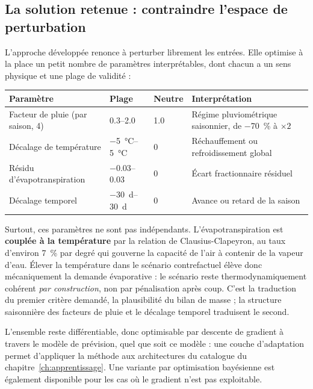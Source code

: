 \subsection{La solution retenue : contraindre l'espace de perturbation}

L'approche développée renonce à perturber librement les entrées. Elle optimise à la place un
petit nombre de paramètres interprétables, dont chacun a un sens physique et une plage de
validité :

\begin{center}
\begin{tabularx}{\textwidth}{@{}lllX@{}}
\toprule
\textbf{Paramètre} & \textbf{Plage} & \textbf{Neutre} & \textbf{Interprétation} \\
\midrule
Facteur de pluie (par saison, 4) & \numrange{0,3}{2,0} & \num{1,0} & Régime pluviométrique
saisonnier, de \SI{-70}{\percent} à $\times 2$ \\
Décalage de température & \SIrange{-5}{5}{\celsius} & \num{0} & Réchauffement ou refroidissement
global \\
Résidu d'évapotranspiration & \numrange{-0,03}{0,03} & \num{0} & Écart fractionnaire résiduel \\
Décalage temporel & \SIrange{-30}{30}{\day} & \num{0} & Avance ou retard de la saison \\
\bottomrule
\end{tabularx}
\end{center}

Surtout, ces paramètres ne sont pas indépendants. L'évapotranspiration est \textbf{couplée à la
température} par la relation de Clausius-Clapeyron, au taux d'environ \SI{7}{\percent} par degré
qui gouverne la capacité de l'air à contenir de la vapeur d'eau. Élever la température dans le
scénario contrefactuel élève donc mécaniquement la demande évaporative : le scénario reste
thermodynamiquement cohérent \emph{par construction}, non par pénalisation après coup. C'est la
traduction du premier critère demandé, la plausibilité du bilan de masse ; la structure
saisonnière des facteurs de pluie et le décalage temporel traduisent le second.

L'ensemble reste différentiable, donc optimisable par descente de gradient à travers le modèle
de prévision, quel que soit ce modèle : une couche d'adaptation permet d'appliquer la méthode
aux architectures du catalogue du chapitre~\ref{ch:apprentissage}. Une variante par optimisation
bayésienne est également disponible pour les cas où le gradient n'est pas exploitable.

